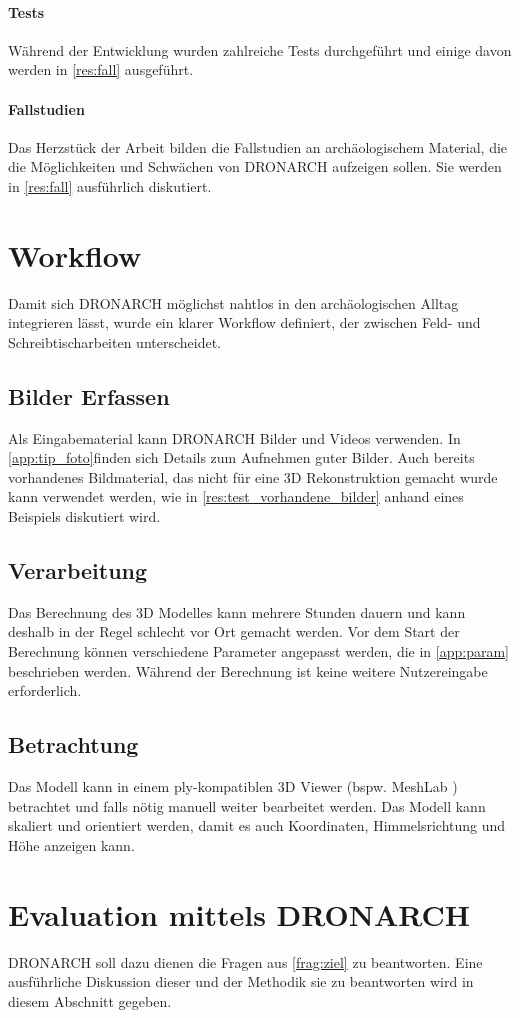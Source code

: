 		\paragraph{Tests}
		Während der Entwicklung wurden zahlreiche Tests durchgeführt und einige davon werden in \autoref{res:fall} ausgeführt.
		
		\paragraph{Fallstudien}
		Das Herzstück der Arbeit bilden die Fallstudien an archäologischem Material, die die Möglichkeiten und Schwächen von DRONARCH aufzeigen sollen. Sie werden in \autoref{res:fall} ausführlich diskutiert.
		
	\section{Workflow}
		Damit sich DRONARCH möglichst nahtlos in den archäologischen Alltag integrieren lässt, wurde ein klarer Workflow definiert, der zwischen Feld- und Schreibtischarbeiten unterscheidet.
		
		\subsection{Bilder Erfassen}
			Als Eingabematerial kann DRONARCH Bilder und Videos verwenden. In \autoref{app:tip_foto}finden sich Details zum Aufnehmen guter Bilder.
			Auch bereits vorhandenes Bildmaterial, das nicht für eine 3D Rekonstruktion gemacht wurde kann  verwendet werden, wie in \autoref{res:test_vorhandene_bilder} anhand eines Beispiels diskutiert wird.
		
		\subsection{Verarbeitung}
			Das Berechnung des 3D Modelles kann mehrere Stunden dauern und kann deshalb in der Regel schlecht vor Ort gemacht werden. Vor dem Start der Berechnung können verschiedene Parameter angepasst werden, die in \autoref{app:param} beschrieben werden.
			Während der Berechnung ist keine weitere Nutzereingabe erforderlich.
		
		\subsection{Betrachtung}
			Das Modell kann in einem ply-kompatiblen 3D Viewer (bspw. MeshLab \cite{meshlab:home}) betrachtet und falls nötig manuell weiter bearbeitet werden.
			Das Modell kann skaliert und orientiert werden, damit es auch Koordinaten, Himmelsrichtung und Höhe anzeigen kann.
	
	\section{Evaluation mittels DRONARCH}
		DRONARCH soll dazu dienen die Fragen aus \autoref{frag:ziel} zu beantworten. Eine ausführliche Diskussion dieser und der Methodik sie zu beantworten wird in diesem Abschnitt gegeben.
		
